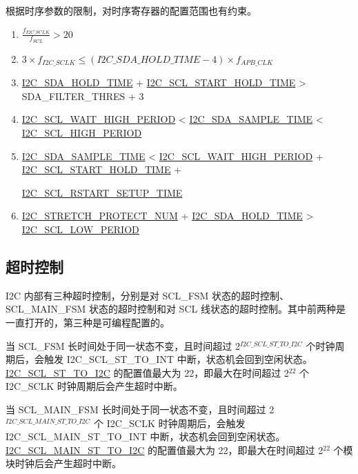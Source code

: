 \documentclass[main\_\_CN.tex]{subfiles}
\begin{document}
根据时序参数的限制，对时序寄存器的配置范围也有约束。
\begin{enumerate}
\item $\frac{f_{I2C\_SCLK}}{f_{SCL}} > 20$
\item $3 \times f_{I2C\_SCLK} \leq (\hyperref[fielddesc:I2CSDAHOLDTIME]{I2C\_SDA\_HOLD\_TIME}-4) \times f_{APB\_CLK}$
\item \hyperref[fielddesc:I2CSDAHOLDTIME]{I2C\_SDA\_HOLD\_TIME} + \hyperref[fielddesc:I2CSCLSTARTHOLDTIME]{I2C\_SCL\_START\_HOLD\_TIME} > SDA\_FILTER\_THRES + 3
\item \hyperref[fielddesc:I2CSCLWAITHIGHPERIOD]{I2C\_SCL\_WAIT\_HIGH\_PERIOD} < \hyperref[fielddesc:I2CSDASAMPLETIME]{I2C\_SDA\_SAMPLE\_TIME} < \hyperref[fielddesc:I2CSCLHIGHPERIOD]{I2C\_SCL\_HIGH\_PERIOD}
\item \hyperref[fielddesc:I2CSDASAMPLETIME]{I2C\_SDA\_SAMPLE\_TIME} < \hyperref[fielddesc:I2CSCLWAITHIGHPERIOD]{I2C\_SCL\_WAIT\_HIGH\_PERIOD} + \hyperref[fielddesc:I2CSCLSTARTHOLDTIME]{I2C\_SCL\_START\_HOLD\_TIME} +

\hyperref[fielddesc:I2CSCLRSTARTSETUPTIME]{I2C\_SCL\_RSTART\_SETUP\_TIME}
\item \hyperref[fielddesc:I2CSTRETCHPROTECTNUM]{I2C\_STRETCH\_PROTECT\_NUM} + \hyperref[fielddesc:I2CSDAHOLDTIME]{I2C\_SDA\_HOLD\_TIME} > \hyperref[fielddesc:I2CSCLLOWPERIOD]{I2C\_SCL\_LOW\_PERIOD}
\end{enumerate}

\subsection{超时控制}
I2C 内部有三种超时控制，分别是对 SCL\_FSM 状态的超时控制、SCL\_MAIN\_FSM 状态的超时控制和对 SCL 线状态的超时控制。其中前两种是一直打开的，第三种是可编程配置的。

当 SCL\_FSM 长时间处于同一状态不变，且时间超过 2$^{\hyperref[fielddesc:I2CSCLSTTOI2C]{I2C\_SCL\_ST\_TO\_I2C}}$ 个时钟周期后，会触发 I2C\_SCL\_ST\_TO\_INT 中断，状态机会回到空闲状态。\hyperref[fielddesc:I2CSCLSTTOI2C]{I2C\_SCL\_ST\_TO\_I2C} 的配置值最大为 22，即最大在时间超过 2$^{22}$ 个 I2C\_SCLK 时钟周期后会产生超时中断。

当 SCL\_MAIN\_FSM 长时间处于同一状态不变，且时间超过 2$^{ \hyperref[fielddesc:I2CSCLMAINSTTOI2C]{I2C\_SCL\_MAIN\_ST\_TO\_I2C} }$ 个 I2C\_SCLK 时钟周期后，会触发 I2C\_SCL\_MAIN\_ST\_TO\_INT 中断，状态机会回到空闲状态。\hyperref[fielddesc:I2CSCLMAINSTTOI2C]{I2C\_SCL\_MAIN\_ST\_TO\_I2C} 的配置值最大为 22，即最大在时间超过 2$^{22}$ 个模块时钟后会产生超时中断。
\end{document}
